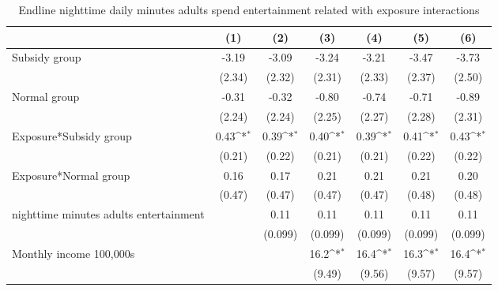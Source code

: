\begin{table}[htbp]\centering
\def\sym#1{\ifmmode^{#1}\else\(^{#1}\)\fi}
\caption{Endline nighttime daily minutes adults spend entertainment related with exposure interactions}
\begin{tabular*}{1\hsize}{@{\hskip\tabcolsep\extracolsep\fill}l*{6}{c}}
\toprule
                &\multicolumn{1}{c}{(1)}         &\multicolumn{1}{c}{(2)}         &\multicolumn{1}{c}{(3)}         &\multicolumn{1}{c}{(4)}         &\multicolumn{1}{c}{(5)}         &\multicolumn{1}{c}{(6)}         \\
\midrule
Subsidy group   &    -3.19         &    -3.09         &    -3.24         &    -3.21         &    -3.47         &    -3.73         \\
                &   (2.34)         &   (2.32)         &   (2.31)         &   (2.33)         &   (2.37)         &   (2.50)         \\
Normal group    &    -0.31         &    -0.32         &    -0.80         &    -0.74         &    -0.71         &    -0.89         \\
                &   (2.24)         &   (2.24)         &   (2.25)         &   (2.27)         &   (2.28)         &   (2.31)         \\
Exposure*Subsidy group&     0.43\sym{*}  &     0.39\sym{*}  &     0.40\sym{*}  &     0.39\sym{*}  &     0.41\sym{*}  &     0.43\sym{*}  \\
                &   (0.21)         &   (0.22)         &   (0.21)         &   (0.21)         &   (0.22)         &   (0.22)         \\
Exposure*Normal group&     0.16         &     0.17         &     0.21         &     0.21         &     0.21         &     0.20         \\
                &   (0.47)         &   (0.47)         &   (0.47)         &   (0.47)         &   (0.48)         &   (0.48)         \\
nighttime minutes adults entertainment&                  &     0.11         &     0.11         &     0.11         &     0.11         &     0.11         \\
                &                  &  (0.099)         &  (0.099)         &  (0.099)         &  (0.099)         &  (0.099)         \\
Monthly income 100,000s&                  &                  &     16.2\sym{*}  &     16.4\sym{*}  &     16.3\sym{*}  &     16.4\sym{*}  \\
                &                  &                  &   (9.49)         &   (9.56)         &   (9.57)         &   (9.57)         \\

\end{tabular*}
\end{table}
